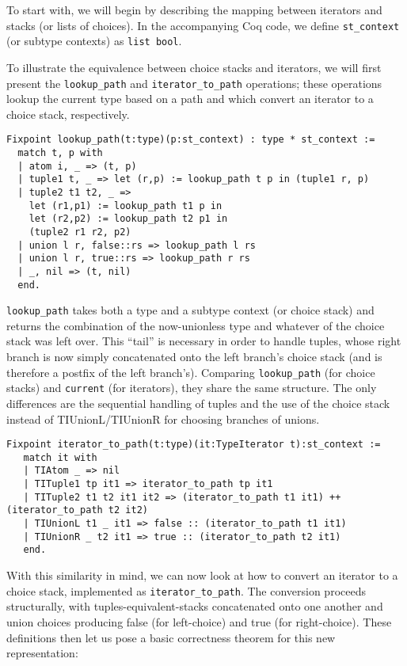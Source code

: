 \documentclass[a4paper,UKenglish]{lipics-v2018}
\begin{document}
To start with, we will begin by describing the mapping between iterators and
stacks (or lists of choices). In the accompanying Coq code, we define
\verb|st_context| (or subtype contexts) as \verb|list bool|.

To illustrate the equivalence between choice stacks and iterators, we will
first present the \verb|lookup_path| and \verb|iterator_to_path| operations;
these operations lookup the current type based on a path and which convert an
iterator to a choice stack, respectively. 

\begin{verbatim}
Fixpoint lookup_path(t:type)(p:st_context) : type * st_context :=
  match t, p with
  | atom i, _ => (t, p)
  | tuple1 t, _ => let (r,p) := lookup_path t p in (tuple1 r, p)
  | tuple2 t1 t2, _ =>
    let (r1,p1) := lookup_path t1 p in
    let (r2,p2) := lookup_path t2 p1 in
    (tuple2 r1 r2, p2)
  | union l r, false::rs => lookup_path l rs
  | union l r, true::rs => lookup_path r rs
  | _, nil => (t, nil)
  end.
\end{verbatim}

\verb|lookup_path| takes both a type and a subtype context (or choice stack)
and returns the combination of the now-unionless type and whatever of the
choice stack was left over. This ``tail'' is necessary in order to handle
tuples, whose right branch is now simply concatenated onto the left branch's
choice stack (and is therefore a postfix of the left branch's). Comparing
\verb|lookup_path| (for choice stacks) and \verb|current| (for iterators), 
they share the same structure. The only differences are the sequential handling
of tuples and the use of the choice stack instead of TIUnionL/TIUnionR for
choosing branches of unions.

\begin{verbatim}
Fixpoint iterator_to_path(t:type)(it:TypeIterator t):st_context :=
   match it with
   | TIAtom _ => nil
   | TITuple1 tp it1 => iterator_to_path tp it1
   | TITuple2 t1 t2 it1 it2 => (iterator_to_path t1 it1) ++ (iterator_to_path t2 it2)
   | TIUnionL t1 _ it1 => false :: (iterator_to_path t1 it1)
   | TIUnionR _ t2 it1 => true :: (iterator_to_path t2 it1)
   end.
\end{verbatim}

With this similarity in mind, we can now look at how to convert an iterator to
a choice stack, implemented as \verb|iterator_to_path|. The conversion
proceeds structurally, with tuples-equivalent-stacks concatenated onto one
another and union choices producing false (for left-choice) and true (for
right-choice). These definitions then let us pose a basic correctness theorem
for this new representation:
\end{document}
